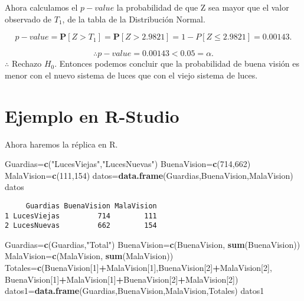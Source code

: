 \documentclass[
  a4paper,
  oneside,
  openany]{book}
\newenvironment{Shaded}{\begin{snugshade}}{\end{snugshade}}
\newcommand{\DecValTok}[1]{\textcolor[rgb]{0.00,0.00,0.81}{#1}}
\newcommand{\FunctionTok}[1]{\textcolor[rgb]{0.13,0.29,0.53}{\textbf{#1}}}
\newcommand{\NormalTok}[1]{#1}
\newcommand{\OtherTok}[1]{\textcolor[rgb]{0.56,0.35,0.01}{#1}}
\newcommand{\SpecialCharTok}[1]{\textcolor[rgb]{0.81,0.36,0.00}{\textbf{#1}}}
\newcommand{\StringTok}[1]{\textcolor[rgb]{0.31,0.60,0.02}{#1}}
\begin{document}
Ahora calculamos el \(p-value\) la probabilidad de que Z sea mayor que el valor observado de \(T_{1}\), de la tabla de la Distribución Normal.

\[p-value=\mathbf{P}[Z>T_{1}]=\mathbf{P}[Z>2.9821]=1-P[Z\leq2.9821]=0.00143.\]

\[\therefore p-value=0.00143 < 0.05=\alpha.\]
\(\therefore\) Rechazo \(H_0\). Entonces podemos concluir que la probabilidad de buena visión es menor con el nuevo sistema de luces que con el viejo sistema de luces.

\hypertarget{ejemplo-en-r-studio-9}{%
\section{Ejemplo en R-Studio}\label{ejemplo-en-r-studio-9}}

Ahora haremos la réplica en R.

\begin{Shaded}
\begin{Highlighting}[]
\NormalTok{Guardias}\OtherTok{=}\FunctionTok{c}\NormalTok{(}\StringTok{"LucesViejas"}\NormalTok{,}\StringTok{"LucesNuevas"}\NormalTok{)}
\NormalTok{BuenaVision}\OtherTok{=}\FunctionTok{c}\NormalTok{(}\DecValTok{714}\NormalTok{,}\DecValTok{662}\NormalTok{)}
\NormalTok{MalaVision}\OtherTok{=}\FunctionTok{c}\NormalTok{(}\DecValTok{111}\NormalTok{,}\DecValTok{154}\NormalTok{)}
\NormalTok{datos}\OtherTok{=}\FunctionTok{data.frame}\NormalTok{(Guardias,BuenaVision,MalaVision)}
\NormalTok{datos}
\end{Highlighting}
\end{Shaded}

\begin{verbatim}
     Guardias BuenaVision MalaVision
1 LucesViejas         714        111
2 LucesNuevas         662        154
\end{verbatim}

\begin{Shaded}
\begin{Highlighting}[]
\NormalTok{Guardias}\OtherTok{=}\FunctionTok{c}\NormalTok{(Guardias,}\StringTok{"Total"}\NormalTok{)}
\NormalTok{BuenaVision}\OtherTok{=}\FunctionTok{c}\NormalTok{(BuenaVision, }\FunctionTok{sum}\NormalTok{(BuenaVision))}
\NormalTok{MalaVision}\OtherTok{=}\FunctionTok{c}\NormalTok{(MalaVision, }\FunctionTok{sum}\NormalTok{(MalaVision))}
\NormalTok{Totales}\OtherTok{=}\FunctionTok{c}\NormalTok{(BuenaVision[}\DecValTok{1}\NormalTok{]}\SpecialCharTok{+}\NormalTok{MalaVision[}\DecValTok{1}\NormalTok{],BuenaVision[}\DecValTok{2}\NormalTok{]}\SpecialCharTok{+}\NormalTok{MalaVision[}\DecValTok{2}\NormalTok{],}
\NormalTok{           BuenaVision[}\DecValTok{1}\NormalTok{]}\SpecialCharTok{+}\NormalTok{MalaVision[}\DecValTok{1}\NormalTok{]}\SpecialCharTok{+}\NormalTok{BuenaVision[}\DecValTok{2}\NormalTok{]}\SpecialCharTok{+}\NormalTok{MalaVision[}\DecValTok{2}\NormalTok{])}
\NormalTok{datos1}\OtherTok{=}\FunctionTok{data.frame}\NormalTok{(Guardias,BuenaVision,MalaVision,Totales)}
\NormalTok{datos1}
\end{Highlighting}
\end{Shaded}
\end{document}
